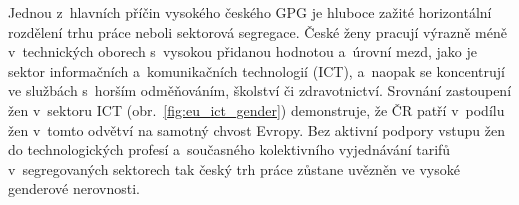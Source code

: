 

Jednou z~hlavních příčin vysokého českého \acs{GPG} je hluboce zažité horizontální rozdělení trhu práce neboli sektorová segregace. České ženy pracují výrazně méně v~technických oborech s~vysokou přidanou hodnotou a~úrovní mezd, jako je sektor informačních a~komunikačních technologií (\acs{ICT}), a~naopak se koncentrují ve službách s~horším odměňováním, školství či zdravotnictví. Srovnání zastoupení žen v~sektoru \acs{ICT} (obr.~\ref{fig:eu_ict_gender}) demonstruje, že \ac{ČR} patří v~podílu žen v~tomto odvětví na samotný chvost Evropy. Bez aktivní podpory vstupu žen do technologických profesí a~současného kolektivního vyjednávání tarifů v~segregovaných sektorech tak český trh práce zůstane uvězněn ve vysoké genderové nerovnosti.\par
